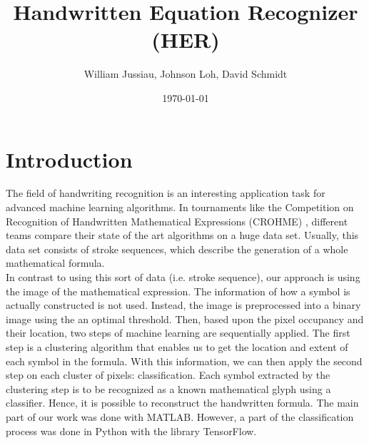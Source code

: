 \documentclass[twocolumn]{article}%
\title{Handwritten Equation Recognizer (HER)}
\author{William Jussiau, Johnson Loh, David Schmidt}
\date{\today}
\begin{document}


	\section{Introduction}
		The field of handwriting recognition is an interesting application task for advanced machine learning algorithms. In tournaments like the Competition on Recognition of Handwritten Mathematical Expressions (CROHME) \cite{crohme}, different teams compare their state of the art algorithms on a huge data set. Usually, this data set consists of stroke sequences, which describe the generation of a whole mathematical formula.\\
		In contrast to using this sort of data (i.e. stroke sequence), our approach is using the image of the mathematical expression. The information of how a symbol is actually constructed is not used. Instead, the image is preprocessed into a binary image using the an optimal threshold. Then, based upon the pixel occupancy and their location, two steps of machine learning are sequentially applied. The first step is a clustering algorithm that enables us to get the location and extent of each symbol in the formula. With this information, we can then apply the second step on each cluster of pixels: classification. Each symbol extracted by the clustering step is to be recognized as a known mathematical glyph using a classifier.  Hence, it is possible to reconstruct the handwritten formula.
		The main part of our work was done with MATLAB. However, a part of the classification process was done in Python with the library TensorFlow.
	    	    
\end{document}
